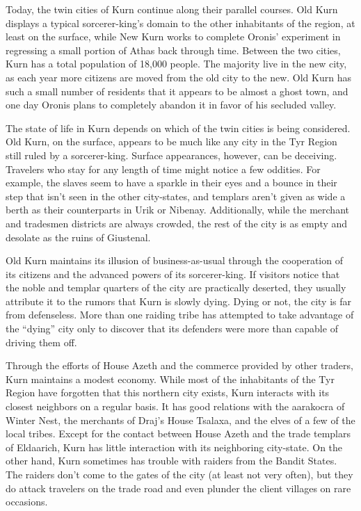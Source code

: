{	Today, the twin cities of Kurn continue along their parallel courses. Old Kurn displays a typical sorcerer-king's domain to the other inhabitants of the region, at least on the surface, while New Kurn works to complete Oronis' experiment in regressing a small portion of Athas back through time. Between the two cities, Kurn has a total population of 18,000 people. The majority live in the new city, as each year more citizens are moved from the old city to the new. Old Kurn has such a small number of residents that it appears to be almost a ghost town, and one day Oronis plans to completely abandon it in favor of his secluded valley.
}
{
	The state of life in Kurn depends on which of the twin cities is being considered. Old Kurn, on the surface, appears to be much like any city in the Tyr Region still ruled by a sorcerer-king. Surface appearances, however, can be deceiving. Travelers who stay for any length of time might notice a few oddities. For example, the slaves seem to have a sparkle in their eyes and a bounce in their step that isn't seen in the other city-states, and templars aren't given as wide a berth as their counterparts in Urik or Nibenay. Additionally, while the merchant and tradesmen districts are always crowded, the rest of the city is as empty and desolate as the ruins of Giustenal.

	Old Kurn maintains its illusion of business-as-usual through the cooperation of its citizens and the advanced powers of its sorcerer-king. If visitors notice that the noble and templar quarters of the city are practically deserted, they usually attribute it to the rumors that Kurn is slowly dying. Dying or not, the city is far from defenseless. More than one raiding tribe has attempted to take advantage of the ``dying'' city only to discover that its defenders were more than capable of driving them off.

	Through the efforts of House Azeth and the commerce provided by other traders, Kurn maintains a modest economy. While most of the inhabitants of the Tyr Region have forgotten that this northern city exists, Kurn interacts with its closest neighbors on a regular basis. It has good relations with the aarakocra of Winter Nest, the merchants of Draj's House Tsalaxa, and the elves of a few of the local tribes. Except for the contact between House Azeth and the trade templars of Eldaarich, Kurn has little interaction with its neighboring city-state. On the other hand, Kurn sometimes has trouble with raiders from the Bandit States. The raiders don't come to the gates of the city (at least not very often), but they do attack travelers on the trade road and even plunder the client villages on rare occasions.

}
